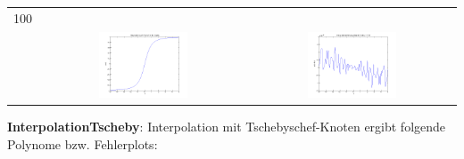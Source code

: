 \documentclass[11pt,a4paper,ngerman]{article}
\begin{document}
\begin{tabular}{l|cc}
100 & & \\
& \includegraphics[width=0.45\textwidth]{plotE_AD_100.png} & \includegraphics[width=0.45\textwidth]{fehlerAD_100.png} \\
\end{tabular}

\newpage
\textbf{InterpolationTscheby}: Interpolation mit Tschebyschef-Knoten ergibt folgende Polynome bzw. Fehlerplots:
\end{document}
